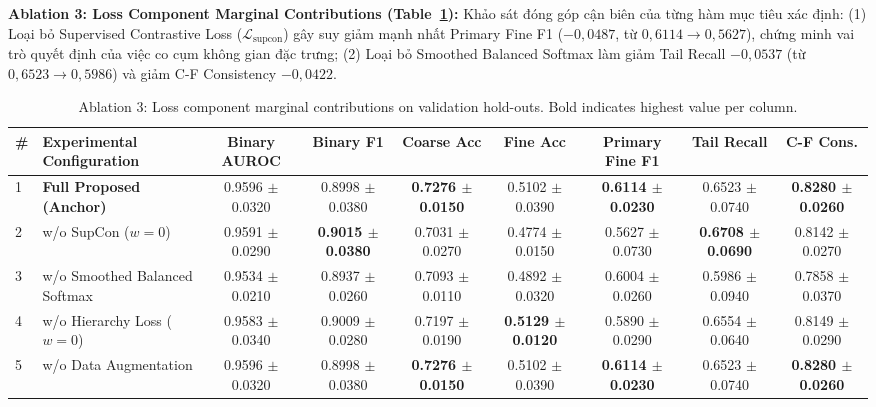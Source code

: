 \documentclass[runningheads]{llncs}
\begin{document}
\noindent \textbf{Ablation 3: Loss Component Marginal Contributions (Table~\ref{tab:ablation_loss_components}):} 
Khảo sát đóng góp cận biên của từng hàm mục tiêu xác định: (1) Loại bỏ Supervised Contrastive Loss ($\mathcal{L}_{\text{supcon}}$) gây suy giảm mạnh nhất Primary Fine F1 ($-0{,}0487$, từ $0{,}6114 \to 0{,}5627$), chứng minh vai trò quyết định của việc co cụm không gian đặc trưng; (2) Loại bỏ Smoothed Balanced Softmax làm giảm Tail Recall $-0{,}0537$ (từ $0{,}6523 \to 0{,}5986$) và giảm C-F Consistency $-0{,}0422$.

\begin{table}[t]
\centering
\caption{Ablation 3: Loss component marginal contributions on validation hold-outs. Bold indicates highest value per column.}
\label{tab:ablation_loss_components}
\begin{adjustbox}{max width=\textwidth}
\begin{tabular}{llccccccc}
\toprule
\textbf{\#} & \textbf{Experimental Configuration} & \textbf{Binary AUROC} & \textbf{Binary F1} & \textbf{Coarse Acc} & \textbf{Fine Acc} & \textbf{Primary Fine F1} & \textbf{Tail Recall} & \textbf{C-F Cons.} \\
\midrule
1 & \textbf{Full Proposed (Anchor)} & 0.9596 $\pm$ 0.0320 & 0.8998 $\pm$ 0.0380 & \textbf{0.7276 $\pm$ 0.0150} & 0.5102 $\pm$ 0.0390 & \textbf{0.6114 $\pm$ 0.0230} & 0.6523 $\pm$ 0.0740 & \textbf{0.8280 $\pm$ 0.0260} \\
2 & w/o SupCon ($w=0$) & 0.9591 $\pm$ 0.0290 & \textbf{0.9015 $\pm$ 0.0380} & 0.7031 $\pm$ 0.0270 & 0.4774 $\pm$ 0.0150 & 0.5627 $\pm$ 0.0730 & \textbf{0.6708 $\pm$ 0.0690} & 0.8142 $\pm$ 0.0270 \\
3 & w/o Smoothed Balanced Softmax & 0.9534 $\pm$ 0.0210 & 0.8937 $\pm$ 0.0260 & 0.7093 $\pm$ 0.0110 & 0.4892 $\pm$ 0.0320 & 0.6004 $\pm$ 0.0260 & 0.5986 $\pm$ 0.0940 & 0.7858 $\pm$ 0.0370 \\
4 & w/o Hierarchy Loss ($w=0$) & 0.9583 $\pm$ 0.0340 & 0.9009 $\pm$ 0.0280 & 0.7197 $\pm$ 0.0190 & \textbf{0.5129 $\pm$ 0.0120} & 0.5890 $\pm$ 0.0290 & 0.6554 $\pm$ 0.0640 & 0.8149 $\pm$ 0.0290 \\
5 & w/o Data Augmentation & 0.9596 $\pm$ 0.0320 & 0.8998 $\pm$ 0.0380 & \textbf{0.7276 $\pm$ 0.0150} & 0.5102 $\pm$ 0.0390 & \textbf{0.6114 $\pm$ 0.0230} & 0.6523 $\pm$ 0.0740 & \textbf{0.8280 $\pm$ 0.0260} \\
\bottomrule
\end{tabular}
\end{adjustbox}
\end{table}
\end{document}
